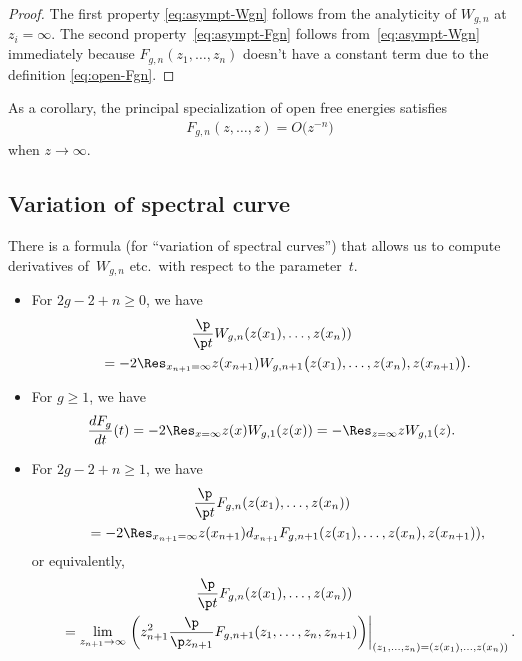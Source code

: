 \begin{proof}
The f\/irst property \eqref{eq:asympt-Wgn} follows from the
analyticity of $W_{g,n}$ at $z_i = \infty$.
The second property~\eqref{eq:asympt-Fgn} follows
from~\eqref{eq:asympt-Wgn} immediately
because $F_{g,n}(z_{1},\dots,z_{n})$ doesn't have
a constant term due to the def\/inition \eqref{eq:open-Fgn}.
\end{proof}

As a corollary, the principal specialization
of open free energies satisf\/ies
\begin{gather} \label{eq:decay-of-Fgn-prin}
F_{g,n}(z,\dots,z) = O\big(z^{-n}\big)
\end{gather}
when $z \rightarrow \infty$.

\subsection{Variation of spectral curve}
\label{section:variation-formula}

There is a formula (for ``variation of spectral curves'')
that allows us to compute derivatives of~$W_{g,n}$ etc.\
with respect to the parameter~$t$.

\begin{thm} [cf.~\protect{\cite[Theorem~5.1]{EO07}}]\label{thm:variation}\quad
\begin{itemize}\itemsep=0pt
\item[$(i)$]
For $2g-2+n \ge 0$, we have
\begin{gather}
\frac{\p}{\p t} W_{g,n}(z(x_{1}), \dots, z(x_{n}))\nonumber\\
\qquad{}
= -2\Res_{x_{n+1}=\infty} z(x_{n+1})
W_{g,n+1}\bigl( z(x_{1}),\dots,z(x_{n}),z(x_{n+1}) \bigr).\label{eq:variation-Wgn}
\end{gather}
\item[$(ii)$]
For $g \ge 1$, we have
\begin{gather} \label{eq:dt-closed-Fg}
\frac{dF_{g}}{dt}(t)
 = - 2\Res_{x=\infty} z(x) W_{g,1}(z(x))
= -\Res_{z=\infty} z W_{g,1}(z).
\end{gather}
\item[$(iii)$]
For $2g-2+ n \ge 1$, we have
\begin{gather*} %
\frac{\p}{\p t} F_{g,n}(z(x_{1}),\dots,z(x_{n})) \\
\qquad{} =
- 2\Res_{x_{n+1}=\infty} z(x_{n+1})
d_{x_{n+1}} F_{g,n+1}(z(x_{1}),\dots,z(x_{n}),z(x_{n+1})),
\end{gather*}
or equivalently,
\begin{gather}
\frac{\p}{\p t} F_{g,n}(z(x_{1}),\dots,z(x_{n})) \nonumber\\
\qquad{}= \lim_{z_{n+1} \rightarrow \infty} \left.
\left( z_{n+1}^{2}
\frac{\p}{\p z_{n+1}}F_{g,n+1}(z_{1},\dots,z_{n},z_{n+1})\right)
\right|_{(z_{1},\dots,z_{n})=(z(x_{1}), \dots, z(x_{n}))}. \label{eq:variation-openFgn-2}
\end{gather}
\end{itemize}
\end{thm}

